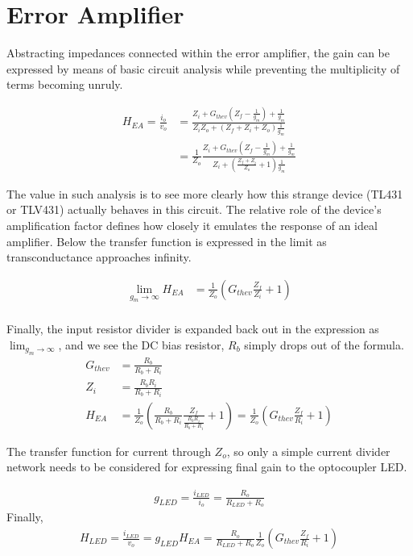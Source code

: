 \documentclass{scrartcl}
\begin{document}
\section{Error Amplifier}

Abstracting impedances connected within the error amplifier, the gain can be expressed by means of basic circuit analysis while preventing the multiplicity of terms becoming unruly.

	\begin{align}
		H_{EA} = \frac{i_o}{v_o} &= \frac{ Z_i + G_{thev}(Z_f - \frac{1}{g_m}) +  \frac{1}{g_m} } {Z_i Z_o + (Z_f + Z_i + Z_o)\frac{1}{g_m}} \\
		 &= \frac{1}{Z_o} \frac{ Z_i + G_{thev}(Z_f - \frac{1}{g_m}) +  \frac{1}{g_m} } {Z_i + ( \frac{Z_f + Z_i}{Z_o} + 1)\frac{1}{g_m}}
	\end{align}
	
	The value in such analysis is to see more clearly how this strange device (TL431 or TLV431) actually behaves in this circuit.  The relative role of the device's amplification factor defines how closely it emulates the response of an ideal amplifier.  Below the transfer function is expressed in the limit as transconductance approaches infinity.
	
	\begin{align}
		\lim_{g_m \to \infty} H_{EA} &= \frac{1}{Z_o} (G_{thev} \frac{Z_f }{Z_i} + 1) \label{lim_Hea} \\
	\end{align}
	
	Finally, the input resistor divider is expanded back out in the expression as $\lim_{g_m \to \infty}$, and we see the DC bias resistor, $R_b$ simply drops out of the formula.
	\begin{align}
		G_{thev} &= \frac{R_b}{R_b+R_i}\\
		Z_i &= \frac{R_b R_i}{R_b + R_i}\\
		H_{EA} &= \frac{1}{Z_o} (\frac{R_b}{R_b+R_i} \frac{Z_f }{\frac{R_b R_i}{R_b + R_i}} + 1) = \frac{1}{Z_o} (G_{thev} \frac{Z_f }{R_i} + 1)
	\end{align}
	
	The transfer function for current through $Z_o$, so only a simple current divider network needs to be considered for expressing final gain to the optocoupler LED.
	
	\begin{align}
		g_{LED} = \frac{i_{LED}}{i_o} = \frac{R_o}{R_{LED} + R_o}
	\end{align}
	Finally,
	\begin{align}
		H_{LED} = \frac{i_{LED}} {v_o} = g_{LED} H_{EA} = \frac{R_o}{R_{LED} + R_o} \frac{1}{Z_o} (G_{thev} \frac{Z_f }{R_i} + 1)
	\end{align}
	
\end{document}
